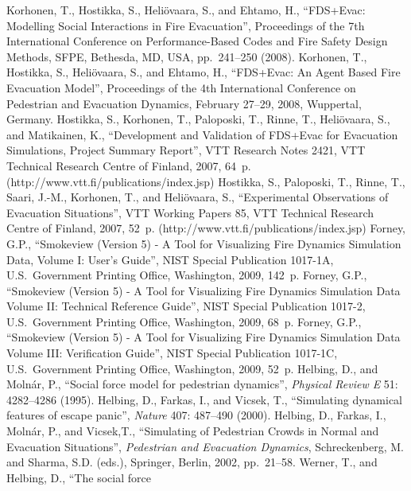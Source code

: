 \documentclass[12pt,a4paper,final,twoside]{stylevk}
\begin{document}
\begin{thebibliography}{99}
%
 Korhonen, T., Hostikka, S., Heli\"ovaara, S.,
  and Ehtamo, H., ``FDS+Evac: Modelling Social Interactions in Fire
  Evacuation'', Proceedings of the 7th International Conference on
  Performance-Based Codes and Fire Safety Design Methods, SFPE,
  Bethesda, MD, USA, pp.~241--250 (2008).
%
 Korhonen, T., Hostikka, S., Heli\"ovaara, S.,
  and Ehtamo, H., ``FDS+Evac: An Agent Based Fire Evacuation Model'',
  Proceedings of the 4th International Conference on Pedestrian and
  Evacuation Dynamics, February 27--29, 2008, Wuppertal, Germany.
%
 Hostikka, S., Korhonen, T., Paloposki, T.,
  Rinne, T., Heli\"ovaara, S., and Matikainen, K., ``Development and
  Validation of FDS+Evac for Evacuation Simulations, Project Summary
  Report'', VTT Research Notes 2421, VTT Technical Research Centre of
  Finland, 2007, 64~p. (http://www.vtt.fi/publications/index.jsp)
%
 Hostikka, S., Paloposki, T., Rinne, T., Saari,
  J.-M., Korhonen, T., and Heli\"ovaara, S., ``Experimental
  Observations of Evacuation Situations'', VTT Working Papers 85, VTT
  Technical Research Centre of Finland, 2007, 52~p.
  (http://www.vtt.fi/publications/index.jsp)
%
 Forney, G.P., ``Smokeview (Version 5) - A Tool
  for Visualizing Fire Dynamics Simulation Data, Volume I: User's
  Guide'', NIST Special Publication 1017-1A, U.S.~Government Printing
  Office, Washington, 2009, 142~p.
%
 Forney, G.P., ``Smokeview (Version 5) - A Tool
  for Visualizing Fire Dynamics Simulation Data Volume II: Technical
  Reference Guide'', NIST Special Publication 1017-2, U.S.~Government
  Printing Office, Washington, 2009, 68~p.
%
 Forney, G.P., ``Smokeview (Version 5) - A Tool
  for Visualizing Fire Dynamics Simulation Data Volume III:
  Verification Guide'', NIST Special Publication 1017-1C,
  U.S.~Government Printing Office, Washington, 2009, 52~p.
%
 Helbing, D., and Moln\'ar, P., ``Social force
  model for pedestrian dynamics'', \emph{Physical Review E} 51:
  4282--4286 (1995).
%
 Helbing, D., Farkas, I., and Vicsek, T.,
  ``Simulating dynamical features of escape panic'', \emph{Nature}
  407: 487--490 (2000).
%
 Helbing, D., Farkas, I., Moln\'ar, P., and
  Vicsek,T., ``Simulating of Pedestrian Crowds in Normal and
  Evacuation Situations'', \emph{Pedestrian and Evacuation Dynamics},
  Schreckenberg, M. and Sharma, S.D. (eds.), Springer, Berlin, 2002,
  pp.~21--58.
%
 Werner, T., and Helbing, D., ``The social force

\end{thebibliography}
\end{document}
